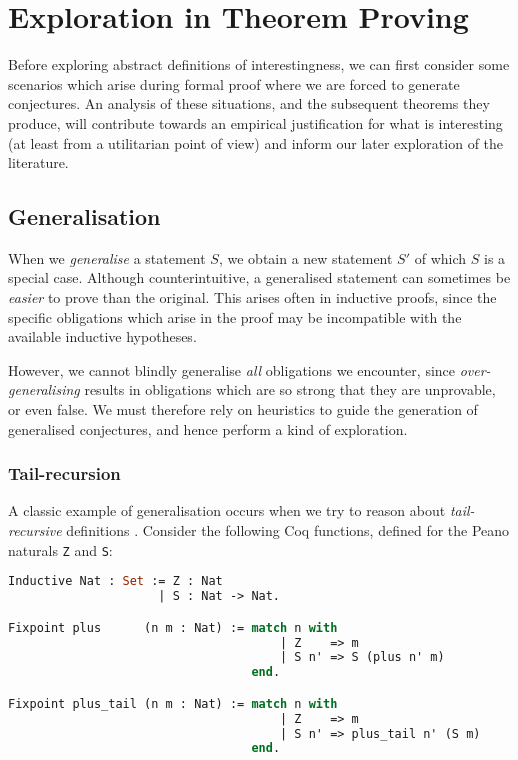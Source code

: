 \documentclass[]{article}
\begin{document}
\section{Exploration in Theorem Proving}
\label{examples}

Before exploring abstract definitions of interestingness, we can first consider some scenarios which arise during formal proof where we are forced to generate conjectures. An analysis of these situations, and the subsequent theorems they produce, will contribute towards an empirical justification for what is interesting (at least from a utilitarian point of view) and inform our later exploration of the literature.

\subsection{Generalisation}

\providecommand{\coq}[1]{\lstinline[language=ML]|#1|}

When we \emph{generalise} a statement $S$, we obtain a new statement $S'$ of which $S$ is a special case. Although counterintuitive, a generalised statement can sometimes be \emph{easier} to prove than the original. This arises often in inductive proofs, since the specific obligations which arise in the proof may be incompatible with the available inductive hypotheses.

However, we cannot blindly generalise \emph{all} obligations we encounter, since \emph{over-generalising} results in obligations which are so strong that they are unprovable, or even false. We must therefore rely on heuristics to guide the generation of generalised conjectures, and hence perform a kind of exploration.

\subsubsection{Tail-recursion}

A classic example of generalisation occurs when we try to reason about \emph{tail-recursive} definitions \cite{kapur2003automatic}. Consider the following Coq functions, defined for the Peano naturals \coq{Z} and \coq{S}:

\begin{lstlisting}[language=ML, xleftmargin=.2\textwidth, xrightmargin=.2\textwidth]
Inductive Nat : Set := Z : Nat
                     | S : Nat -> Nat.

Fixpoint plus      (n m : Nat) := match n with
                                      | Z    => m
                                      | S n' => S (plus n' m)
                                  end.

Fixpoint plus_tail (n m : Nat) := match n with
                                      | Z    => m
                                      | S n' => plus_tail n' (S m)
                                  end.
\end{lstlisting}
\end{document}
